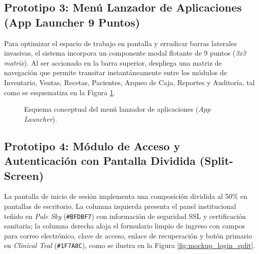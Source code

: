 \subsection{Prototipo 3: Menú Lanzador de Aplicaciones (App Launcher 9 Puntos)}
Para optimizar el espacio de trabajo en pantalla y erradicar barras laterales invasivas, el sistema incorpora un componente modal flotante de 9 puntos (\textit{3x3 matrix}). Al ser accionado en la barra superior, despliega una matriz de navegación que permite transitar instantáneamente entre los módulos de Inventario, Ventas, Recetas, Pacientes, Arqueo de Caja, Reportes y Auditoría, tal como se esquematiza en la Figura \ref{fig:mockup_launcher}.

\begin{figure}[H]
    \centering
    \caption{Esquema conceptual del menú lanzador de aplicaciones (\textit{App Launcher}).}
    \label{fig:mockup_launcher}
\end{figure}

\subsection{Prototipo 4: Módulo de Acceso y Autenticación con Pantalla Dividida (Split-Screen)}
La pantalla de inicio de sesión implementa una composición dividida al 50\% en pantallas de escritorio. La columna izquierda presenta el panel institucional teñido en \textit{Pale Sky} (\texttt{\#BFDBF7}) con información de seguridad SSL y certificación sanitaria; la columna derecha aloja el formulario limpio de ingreso con campos para correo electrónico, clave de acceso, enlace de recuperación y botón primario en \textit{Clinical Teal} (\texttt{\#1F7A8C}), como se ilustra en la Figura \ref{fig:mockup_login_split}.

